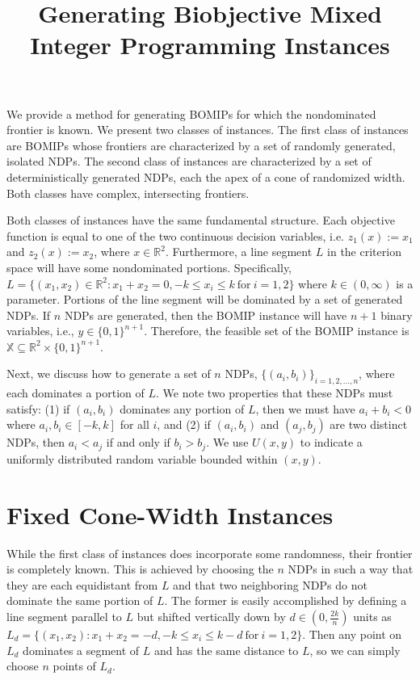 \documentclass[11pt]{article} %
\def\real{\mathbb{R}}
\def\R{\real}
\begin{document}

\title{Generating Biobjective Mixed Integer Programming Instances}

\date{}
\maketitle
 
\noindent We provide a method for generating BOMIPs for which the nondominated frontier is known. We present two classes of instances. The first class of instances are BOMIPs whose frontiers are characterized by a set of randomly generated, isolated NDPs. The second class of instances are characterized by a set of deterministically generated NDPs, each the apex of a cone of randomized width. Both classes have complex, intersecting frontiers.

Both classes of instances have the same fundamental structure. Each objective function is equal to one of the two continuous decision variables, i.e. $z_1(x):=x_1$ and $z_2(x):=x_2$, where $x\in\R^2$. Furthermore, a line segment $L$ in the criterion space will have some nondominated portions. Specifically, $L = \{(x_1,x_2)\in\R^2: x_1+x_2=0, -k\leq x_i\leq k\ \text{for}\ i=1,2\}$ where $k\in (0,\infty)$ is a parameter. Portions of the line segment will be dominated by a set of generated NDPs. If $n$ NDPs are generated, then the BOMIP instance will have $n+1$ binary variables, i.e., $y\in\{0,1\}^{n+1}$. Therefore, the feasible set of the BOMIP instance is $\mathbb{X} \subseteq \R^2 \times \{0,1\}^{n+1}$.

Next, we discuss how to generate a set of $n$ NDPs, $\{(a_i,b_i)\}_{i=1,2,...,n}$, where each dominates a portion of $L$. We note two properties that these NDPs must satisfy: (1) if $(a_i,b_i)$ dominates any portion of $L$, then we must have $a_i+b_i<0$ where $a_i,b_i\in[-k,k]$ for all $i$, and (2) if $(a_i,b_i)$ and $(a_j,b_j)$ are two distinct NDPs, then $a_i < a_j$ if and only if $b_i > b_j$. We use $U(x,y)$ to indicate a uniformly distributed random variable bounded within $(x,y)$.

\section{Fixed Cone-Width Instances}\label{Subsec:FixedDistInstances}

While the first class of instances does incorporate some randomness, their frontier is completely known. This is achieved by choosing the $n$ NDPs in such a way that they are each equidistant from $L$ and that two neighboring NDPs do not dominate the same portion of $L$. The former is easily accomplished by defining a line segment parallel to $L$ but shifted vertically down by $d\in(0,\tfrac{2k}{n})$ units as $L_d = \{ (x_1,x_2): x_1 + x_2=-d, -k\leq x_i\leq k-d\ \text{for}\ i=1,2\}$. Then any point on $L_d$ dominates a segment of $L$ and has the same distance to $L$, so we can simply choose $n$ points of $L_d$. 
\end{document}
